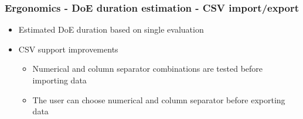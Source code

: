 \documentclass[aspectratio=169]{beamer}
\begin{document}

\begin{frame}
  \frametitle{Ergonomics - DoE duration estimation - CSV import/export}
  \begin{itemize}
  \item Estimated DoE duration based on single evaluation
  \item CSV support improvements
    \begin{itemize}
    \item Numerical and column separator combinations are tested before importing data
    \item The user can choose numerical and column separator before exporting data
    \end{itemize}
  \end{itemize}
\end{frame}

\end{document}
